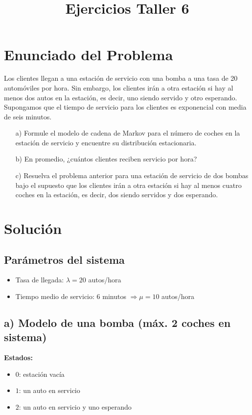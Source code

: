 \documentclass[10pt]{article}
\title{Ejercicios Taller 6}
\author{}
\date{}
\begin{document}
\maketitle

\section*{Enunciado del Problema}

Los clientes llegan a una estación de servicio con una bomba a una tasa de 20 automóviles por hora. Sin embargo, los clientes irán a otra estación si hay al menos dos autos en la estación, es decir, uno siendo servido y otro esperando. Supongamos que el tiempo de servicio para los clientes es exponencial con media de seis minutos.

\begin{itemize}
    \item[a)] Formule el modelo de cadena de Markov para el número de coches en la estación de servicio y encuentre su distribución estacionaria.
    \item[b)] En promedio, ¿cuántos clientes reciben servicio por hora?
    \item[c)] Resuelva el problema anterior para una estación de servicio de dos bombas bajo el supuesto que los clientes irán a otra estación si hay al menos cuatro coches en la estación, es decir, dos siendo servidos y dos esperando.
\end{itemize}

\section*{Solución}

\subsection*{Parámetros del sistema}
\begin{itemize}
    \item Tasa de llegada: $\lambda = 20$ autos/hora
    \item Tiempo medio de servicio: 6 minutos $\Rightarrow \mu = 10$ autos/hora
\end{itemize}

\subsection*{a) Modelo de una bomba (máx. 2 coches en sistema)}

\textbf{Estados:}
\begin{itemize}
    \item $0$: estación vacía
    \item $1$: un auto en servicio
    \item $2$: un auto en servicio y uno esperando
\end{itemize}
\end{document}
